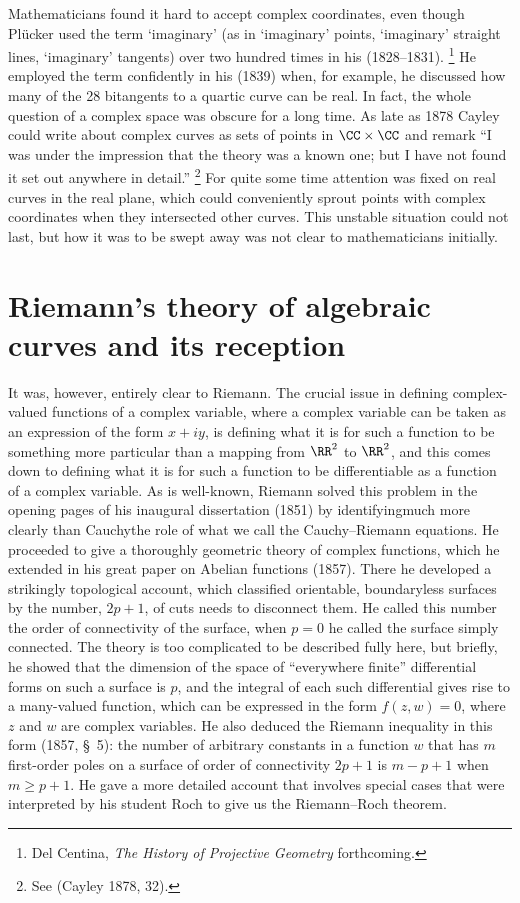 Mathematicians found it hard to accept complex coordinates, even
though Pl\"ucker used the term `imaginary' (as in `imaginary' points,
`imaginary' straight lines, `imaginary' tangents) over two hundred
times in his (1828--1831).%
%
\footnote{Del Centina, \emph{The History of Projective Geometry}
forthcoming.}
%
He employed the term
confidently in his (1839) when, for example, he discussed how many of
the 28 bitangents to a quartic curve can be real. In fact, the whole
question of a complex space was obscure for a long time. As late as
1878 Cayley could write about complex curves as sets of points in
$\CC \times \CC$ and remark ``I was under the impression that the
theory was a known one; but I have not found it set out anywhere in
detail.''%
%
\footnote{See (Cayley 1878, 32).} 
%
For quite some time
attention was fixed on real curves in the real plane, which could
conveniently sprout points with complex coordinates when they
intersected other curves. This unstable situation could not last, but
how it was to be swept away was not clear to mathematicians initially.


\section{Riemann's theory of algebraic curves and its reception}
It was, however, entirely clear to Riemann. The crucial issue in defining
com\-plex-valued functions of a complex variable, where a complex variable
can be taken as an expression of the form $x+ iy$, is defining what it is
for such a function to be something more particular than a mapping from
$\RR^2$ to $\RR^2$, and this comes down to defining what it is for such
a function to be differentiable as a function of a complex variable. As
is well-known, Riemann solved this problem in the opening pages of
his inaugural dissertation  (1851) by identifying\emdash much more
clearly than Cauchy\emdash the role of what we call the Cauchy--Riemann
equations. He proceeded to give a thoroughly geometric theory of complex
functions, which he extended in his great paper on Abelian functions
(1857). There he developed a strikingly topological account, which
classified orientable, boundaryless surfaces by the number, $2p+1$,
of cuts needs to disconnect them. He called this number the order of
connectivity of the surface, when $p=0$ he called the surface simply
connected. The theory is too complicated to be described fully here,
but briefly, he showed that  the dimension of the space of ``everywhere
finite'' differential forms on such a surface is $p$, and the integral
of each such
differential gives rise to a many-valued function, which can be expressed
in the form $f(z, w) = 0$, where $z$ and $w$ are complex variables. He
also deduced the Riemann inequality in this form (1857, \S\, 5):  the
number of arbitrary constants in a function $w$ that has $m$ first-order
poles on a surface of order of connectivity $2p+1$ is $m- p + 1$ when $m
\geq p + 1$. He gave a more detailed account that involves special cases
that were interpreted by his student Roch to give us the Riemann--Roch
theorem.

